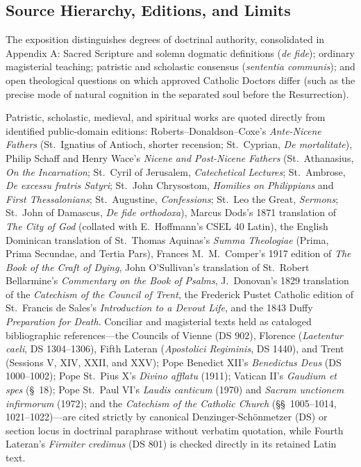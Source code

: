 \subsection*{Source Hierarchy, Editions, and Limits}

The exposition distinguishes degrees of doctrinal authority, consolidated in Appendix A: Sacred Scripture and solemn dogmatic definitions (\textit{de fide}); ordinary magisterial teaching; patristic and scholastic consensus (\textit{sententia communis}); and open theological questions on which approved Catholic Doctors differ (such as the precise mode of natural cognition in the separated soul before the Resurrection).

Patristic, scholastic, medieval, and spiritual works are quoted directly from identified public-domain editions: Roberts--Donaldson--Coxe's \textit{Ante-Nicene Fathers} (St.\ Ignatius of Antioch, shorter recension; St.\ Cyprian, \textit{De mortalitate}), Philip Schaff and Henry Wace's \textit{Nicene and Post-Nicene Fathers} (St.\ Athanasius, \textit{On the Incarnation}; St.\ Cyril of Jerusalem, \textit{Catechetical Lectures}; St.\ Ambrose, \textit{De excessu fratris Satyri}; St.\ John Chrysostom, \textit{Homilies on Philippians} and \textit{First Thessalonians}; St.\ Augustine, \textit{Confessions}; St.\ Leo the Great, \textit{Sermons}; St.\ John of Damascus, \textit{De fide orthodoxa}), Marcus Dods's 1871 translation of \textit{The City of God} (collated with E.\ Hoffmann's CSEL 40 Latin), the English Dominican translation of St.\ Thomas Aquinas's \textit{Summa Theologiae} (Prima, Prima Secundae, and Tertia Pars), Frances M.\ M.\ Comper's 1917 edition of \textit{The Book of the Craft of Dying}, John O'Sullivan's translation of St.\ Robert Bellarmine's \textit{Commentary on the Book of Psalms}, J.\ Donovan's 1829 translation of the \textit{Catechism of the Council of Trent}, the Frederick Pustet Catholic edition of St.\ Francis de Sales's \textit{Introduction to a Devout Life}, and the 1843 Duffy \textit{Preparation for Death}. Conciliar and magisterial texts held as cataloged bibliographic references---the Councils of Vienne (DS 902), Florence (\textit{Laetentur caeli}, DS 1304--1306), Fifth Lateran (\textit{Apostolici Regiminis}, DS 1440), and Trent (Sessions V, XIV, XXII, and XXV); Pope Benedict XII's \textit{Benedictus Deus} (DS 1000--1002); Pope St.\ Pius X's \textit{Divino afflatu} (1911); Vatican II's \textit{Gaudium et spes} (\S~18); Pope St.\ Paul VI's \textit{Laudis canticum} (1970) and \textit{Sacram unctionem infirmorum} (1972); and the \textit{Catechism of the Catholic Church} (\S\S~1005--1014, 1021--1022)---are cited strictly by canonical Denzinger-Sch\"{o}nmetzer (DS) or section locus in doctrinal paraphrase without verbatim quotation, while Fourth Lateran's \textit{Firmiter credimus} (DS 801) is checked directly in its retained Latin text.

